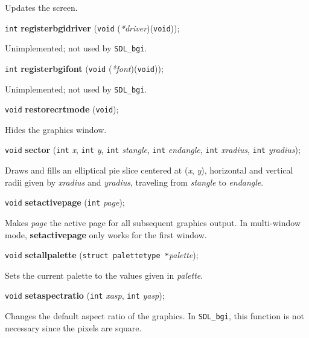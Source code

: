 \documentclass[a4paper,11pt]{article}
\newcommand{\SDLbgi}{\texttt{SDL\_bgi}}
\newcommand{\V}{\texttt{void}}      %
\newcommand{\I}{\texttt{int}}       %
\newcommand{\func}[1]{\textbf{#1}}  %
\newcommand{\A}[1]{\emph{#1}}       %
\newenvironment{bgi}
{ %
  \begin{snugshade}
}
{ %
  \end{snugshade}
}
\begin{document}
Updates the screen.


\begin{bgi}
\I{} \func{registerbgidriver} (\V{} (\A{*driver})(\V{})); 
\end{bgi}

Unimplemented; not used by \SDLbgi.


\begin{bgi}
\I{} \func{registerbgifont} (\V{} (\A{*font})(\V{})); 
\end{bgi}

Unimplemented; not used by \SDLbgi.


\begin{bgi}
\V{} \func{restorecrtmode} (\V{}); 
\end{bgi}

Hides the graphics window.


\begin{bgi}
\V{} \func{sector} (\I{} \A{x}, \I{} \A{y}, \I{} \A{stangle}, \I{}
\A{endangle}, \I{} \A{xradius}, \I{} \A{yradius});
\end{bgi}

Draws and fills an elliptical pie slice centered at (\A{x}, \A{y}),
horizontal and vertical radii given by \A{xradius} and \A{yradius},
traveling from \A{stangle} to \A{endangle}.


\begin{bgi}
\V{} \func{setactivepage} (\I{} \A{page});
\end{bgi}

Makes \A{page} the active page for all subsequent graphics output. In
multi-window mode, \func{setactivepage} only works for the first window.


\begin{bgi}
\V{} \func{setallpalette} (\texttt{struct palettetype *}\A{palette}); 
\end{bgi}

Sets the current palette to the values given in \A{palette}.


\begin{bgi}
\V{} \func{setaspectratio} (\I{} \A{xasp}, \I{} \A{yasp});
\end{bgi}

Changes the default aspect ratio of the graphics. In \SDLbgi, this
function is not necessary since the pixels are square.
\end{document}

